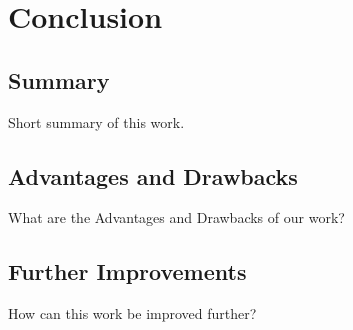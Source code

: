 \section{Conclusion}

\subsection{Summary}

Short summary of this work.

\subsection{Advantages and Drawbacks}

What are the Advantages and Drawbacks of our work?

\subsection{Further Improvements}

How can this work be improved further?